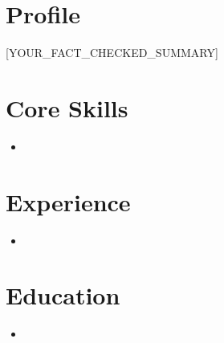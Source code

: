 \documentclass[11pt,a4paper,sans]{moderncv}
\begin{document}
\makecvtitle

\section{Profile}
[YOUR_FACT_CHECKED_SUMMARY]

\section{Core Skills}
\begin{itemize}
  \item [YOUR_PRIMARY_SKILLS]
\end{itemize}

\section{Experience}
\begin{itemize}
  \item{}
\end{itemize}

\section{Education}
\begin{itemize}
  \item{\cventry{[DATES]}{[DEGREE]}{[INSTITUTION]}{[LOCATION]}{}{}}
\end{itemize}
\end{document}
